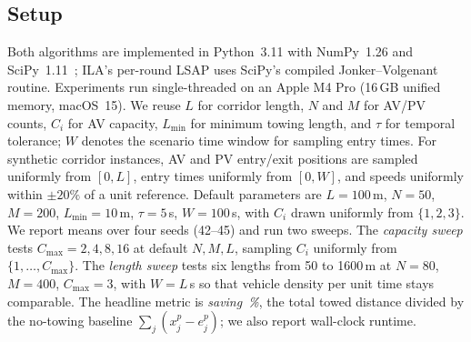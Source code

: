 \documentclass[sigconf]{acmart}
\begin{document}
\subsection{Setup}
\label{sec:setup}
Both algorithms are implemented in Python~3.11 with NumPy~1.26 and SciPy~1.11~\cite{scipy2020}; ILA's per-round LSAP uses SciPy's compiled Jonker--Volgenant routine. Experiments run single-threaded on an Apple M4 Pro (16\,GB unified memory, macOS~15). We reuse $L$ for corridor length, $N$ and $M$ for AV/PV counts, $C_i$ for AV capacity, $L_{\min}$ for minimum towing length, and $\tau$ for temporal tolerance; $W$ denotes the scenario time window for sampling entry times. For synthetic corridor instances, AV and PV entry/exit positions are sampled uniformly from $[0,L]$, entry times uniformly from $[0,W]$, and speeds uniformly within $\pm 20\%$ of a unit reference. Default parameters are $L{=}100$\,m, $N{=}50$, $M{=}200$, $L_{\min}{=}10$\,m, $\tau{=}5$\,s, $W{=}100$\,s, with $C_i$ drawn uniformly from $\{1,2,3\}$. We report means over four seeds (42--45) and run two sweeps. The \emph{capacity sweep} tests $C_{\max}=2,4,8,16$ at default $N,M,L$, sampling $C_i$ uniformly from $\{1,\dots,C_{\max}\}$. The \emph{length sweep} tests six lengths from 50 to 1600\,m at $N{=}80$, $M{=}400$, $C_{\max}{=}3$, with $W{=}L$\,s so that vehicle density per unit time stays comparable. The headline metric is \emph{saving~\%}, the total towed distance divided by the no-towing baseline $\sum_j(x^p_j\!-\!e^p_j)$; we also report wall-clock runtime. %
 

\end{document}
